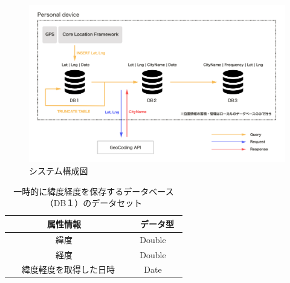 \documentclass[a4paper]{jsarticle}
\begin{document}
\fifigure
\begin{figure}[H]
  \begin{center}
    \includegraphics[width=1.0\hsize]{./images/livingarea_diagram.png}
    \caption{システム構成図}
    \label{fig:livingarea-diagram}
  \end{center}
\end{figure}
\fi

\begin{table}[H]
  \begin{center}
    \caption{一時的に緯度経度を保存するデータベース（DB１）のデータセット}
    \renewcommand\arraystretch{1.4}
    \begin{tabular}{|c|c|}
      \hline
      \multicolumn{1}{|c}{属性情報} & \multicolumn{1}{|c|}{　データ型　} \\
      \hline
      \hline
      \multicolumn{1}{|c}{緯度} & \multicolumn{1}{|c|}{Double} \\
      \hline
      \multicolumn{1}{|c}{経度} & \multicolumn{1}{|c|}{Double} \\
      \hline
      \multicolumn{1}{|c}{　緯度軽度を取得した日時　} & \multicolumn{1}{|c|}{Date} \\
      \hline
    \end{tabular}
    \label{tab:livingarea-db-1}
  \end{center}
\end{table}
\end{document}
